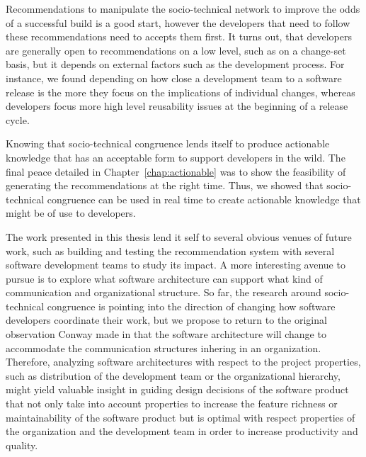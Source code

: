 Recommendations to manipulate the socio-technical network to improve the odds of a successful build is a good start, however the developers that need to follow these recommendations need to accepts them first.
It turns out, that developers are generally open to recommendations on a low level, such as on a change-set basis, but it depends on external factors such as the development process.
For instance, we found depending on how close a development team to a software release is the more they focus on the implications of individual changes, whereas developers focus more high level reusability issues at the beginning of a release cycle.

Knowing that socio-technical congruence lends itself to produce actionable knowledge that has an acceptable form to support developers in the wild.
The final peace detailed in Chapter~\ref{chap:actionable} was to show the feasibility of generating the recommendations at the right time.
Thus, we showed that socio-technical congruence can be used in real time to create actionable knowledge that might be of use to developers.

The work presented in this thesis lend it self to several obvious venues of future work, such as building and testing the recommendation system with several software development teams to study its impact.
A more interesting avenue to pursue is to explore what software architecture can support what kind of communication and organizational structure.
So far, the research around socio-technical congruence is pointing into the direction of changing how software developers coordinate their work, but we propose to return to the original observation Conway made in that the software architecture will change to accommodate the communication structures inhering in an organization.
Therefore, analyzing software architectures with respect to the project properties, such as distribution of the development team or the organizational hierarchy, might yield valuable insight in guiding design decisions of the software product that not only take into account properties to increase the feature richness or maintainability of the software product but is optimal with respect properties of the organization and the development team in order to increase productivity and quality. 
